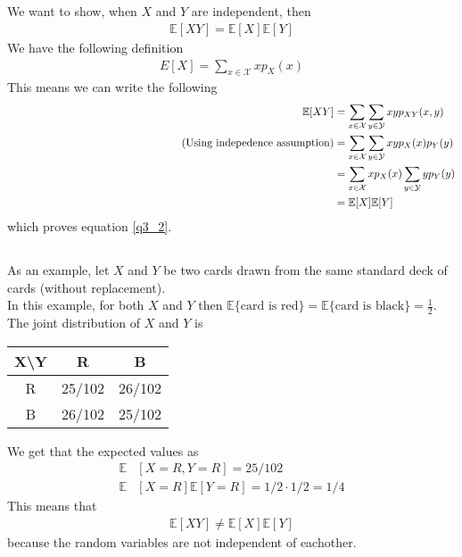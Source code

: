 \documentclass[a4paper]{article}
\newcommand{\comment}[1]{%
  \text{\phantom{(#1)}} \tag{#1}}
\begin{document}
\subsection{}

We want to show, when $X$ and $Y$ are independent, then
\begin{align}
\mathbb{E}[XY]=\mathbb{E}[X]\mathbb{E}[Y]
\label{q3_2}
\end{align}
We have the following definition
\begin{align*}
{E}[X]=\sum_{x\in \mathcal{X}}xp_X(x)
\end{align*}
This means we can write the following
\begin{align*}
\mathbb{E}[XY] &= \sum_{x\in \mathcal{X}}\sum_{y\in \mathcal{Y}} xy p_{XY}(x,y)\\
  \comment{Using indepedence assumption} &= \sum_{x\in \mathcal{X}}\sum_{y\in \mathcal{Y}} xyp_{X}(x)p_{Y}(y) \\
  &= \sum_{x\in \mathcal{X}}xp_{X}(x)\sum_{y\in \mathcal{Y}} yp_{Y}(y) \\
  &= \mathbb{E}[X]\mathbb{E}[Y]
\end{align*}
which proves equation \ref{q3_2}.

\subsection{}

As an example, let $X$ and $Y$ be two cards drawn from the same standard deck of cards (without replacement).\\
In this example, for both $X$ and $Y$ then $\mathbb{E}\{\mbox{card is red}\}=\mathbb{E}\{\mbox{card is black}\}=\frac{1}{2}$.\\
The joint distribution of $X$ and $Y$ is
\begin{center}
\begin{tabular}{c||c|c}
X\textbackslash Y & R & B \\
\hline
\hline
R & 25/102  & 26/102 \\
\hline
B & 26/102 & 25/102 \\
\end{tabular}
\end{center}
We get that the expected values as
\begin{align*}
\mathbb{E}&[X=R,Y=R]=25/102 \\
\mathbb{E}&[X=R]\mathbb{E}[Y=R]=1/2\cdot 1/2 = 1/4
\end{align*}
This means that
\begin{align*}
\mathbb{E}[XY]\neq \mathbb{E}[X]\mathbb{E}[Y]
\end{align*}
because the random variables are not independent of eachother.
\end{document}
